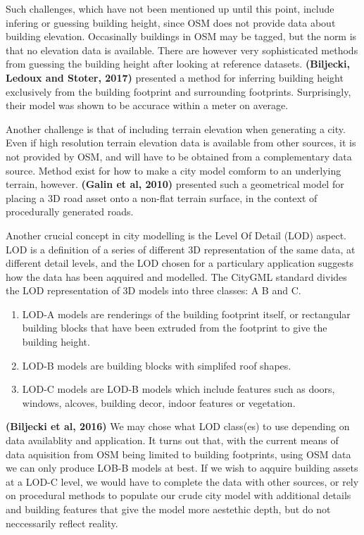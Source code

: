 \documentclass{kththesis}
\begin{document}
Such challenges, which have not been mentioned up until this point, include infering or guessing building height, since OSM does not provide data about building elevation.
Occasinally buildings in OSM may be tagged, but the norm is that no elevation data is available.
There are however very sophisticated methods from guessing the building height after looking at reference datasets.
\textbf{(Biljecki, Ledoux and Stoter, 2017)} presented a method for inferring building height exclusively from the building footprint and surrounding footprints.
Surprisingly, their model was shown to be accurace within a meter on average.

Another challenge is that of including terrain elevation when generating a city.
Even if high resolution terrain elevation data is available from other sources, it is not provided by OSM, and will have to be obtained from a complementary data source.
Method exist for how to make a city model comform to an underlying terrain, however.
\textbf{(Galin et al, 2010)} presented such a geometrical model for placing a 3D road asset onto a non-flat terrain surface, in the context of procedurally generated roads.

Another crucial concept in city modelling is the Level Of Detail (LOD) aspect.
LOD is a definition of a series of different 3D representation of the same data, at different detail levels, and the LOD chosen for a particulary application suggests how the data has been aqquired and modelled.
The CityGML standard divides the LOD representation of 3D models into three classes: A B and C.
\begin{enumerate}
    \item LOD-A models are renderings of the building footprint itself, or rectangular building blocks that have been extruded from the footprint to give the building height.
    \item LOD-B models are building blocks with simplifed roof shapes.
    \item LOD-C models are LOD-B models which include features such as doors, windows, alcoves, building decor, indoor features or vegetation.
\end{enumerate}
\textbf{(Biljecki et al, 2016)}
We may chose what LOD class(es) to use depending on data availablity and application.
It turns out that, with the current means of data aquisition from OSM being limited to building footprints, using OSM data we can only produce LOB-B models at best.
If we wish to aqquire building assets at a LOD-C level, we would have to complete the data with other sources, or rely on procedural methods to populate our crude city model with additional details and building features that give the model more aestethic depth, but do not neccessarily reflect reality.
\end{document}
